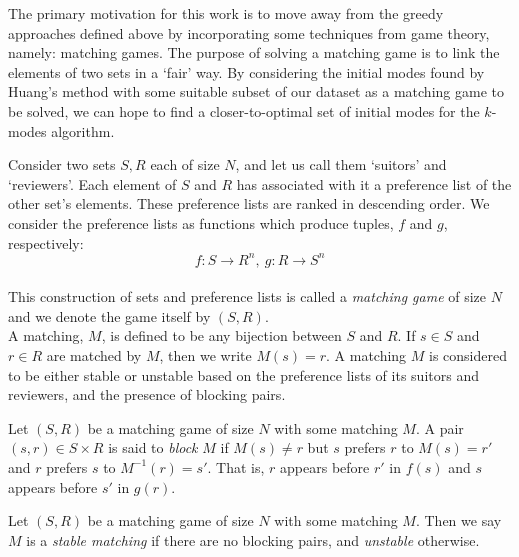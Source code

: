 The primary motivation for this work is to move away from the greedy approaches
defined above by incorporating some techniques from game theory, namely:
matching games. The purpose of solving a matching game is to link the elements
of two sets in a `fair' way. By considering the initial modes found by Huang's 
method with some suitable subset of our dataset as a matching game to be solved, 
we can hope to find a closer-to-optimal set of initial modes for the \(k\)-modes 
algorithm.


\begin{definition}\label{def:matching-game}
    Consider two sets \(S, R\) each of size \(N\), and let us call them 
    `suitors' and `reviewers'. Each element of \(S\) and \(R\) has associated 
    with it a preference list of the other set's elements. These preference 
    lists are ranked in descending order. We consider the preference lists as 
    functions which produce tuples, \(f\) and \(g\), respectively:
	\[
	    f : S \to R^n, \ g : R \to S^n
	\]\\

	This construction of sets and preference lists is called a 
    \emph{matching game} of size \(N\) and we denote the game itself by 
    \((S,R)\).\\
	
    A matching, \(M\), is defined to be any bijection between \(S\) and \(R\). 
    If \(s \in S\) and \(r \in R\) are matched by \(M\), then we write \(M(s) = 
    r\). A matching \(M\) is considered to be either stable or unstable based on
    the preference lists of its suitors and reviewers, and the presence of 
    blocking pairs.
\end{definition}

\begin{definition}\label{def:blocking-pair}
    Let \((S, R)\) be a matching game of size \(N\) with some matching \(M\). A 
    pair \((s, r) \in S \times R\) is said to \emph{block} \(M\) if \(M(s) \neq
    r\) but \(s\) prefers \(r\) to \(M(s) = r'\) and \(r\) prefers \(s\) to
    \(M^{-1}(r) = s'\). That is, \(r\) appears before \(r'\) in \(f(s)\) and
    \(s\) appears before \(s'\) in \(g(r)\).
\end{definition}

\begin{definition}\label{def:stable-matching}
    Let \((S, R)\) be a matching game of size \(N\) with some matching \(M\). 
    Then we say \(M\) is a \emph{stable matching} if there are no blocking 
    pairs, and \emph{unstable} otherwise.
\end{definition}

